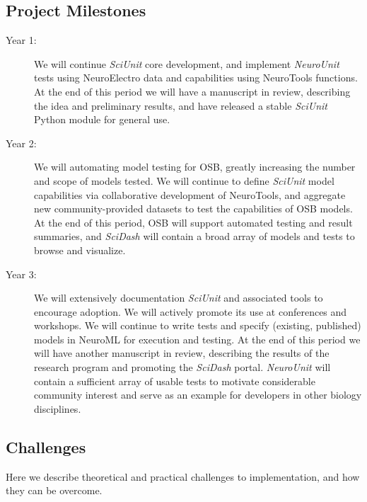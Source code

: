 \documentclass[11pt,letterpaper]{article}
\begin{document}
\subsection{Project Milestones}
\begin{description}
\item[Year 1:] We will continue \textit{SciUnit} core development, and implement \textit{NeuroUnit} tests using NeuroElectro data and capabilities using NeuroTools functions.  At the end of this period we will have a manuscript in review, describing the idea and preliminary results, and have released a stable \textit{SciUnit} Python module for general use. 
\item[Year 2:] We will automating model testing for OSB, greatly increasing the number and scope of models tested.  We will continue to define \textit{SciUnit} model capabilities via collaborative development of NeuroTools, and aggregate new community-provided datasets to test the capabilities of OSB models.  At the end of this period, OSB will support automated testing and result summaries, and \textit{SciDash} will contain a broad array of models and tests to browse and visualize.  
\item[Year 3:] We will extensively documentation \textit{SciUnit} and associated tools to encourage adoption.  We will actively promote its use at conferences and workshops.  We will continue to write tests and specify (existing, published) models in NeuroML for execution and testing. At the end of this period we will have another manuscript in review, describing the results of the research program and promoting the \textit{SciDash} portal.  \textit{NeuroUnit} will contain a sufficient array of usable tests to motivate considerable community interest and serve as an example for developers in other biology disciplines.  
\end{description}
\subsection{Challenges}
Here we describe theoretical and practical challenges to implementation, and how they can be overcome.
\end{document}
